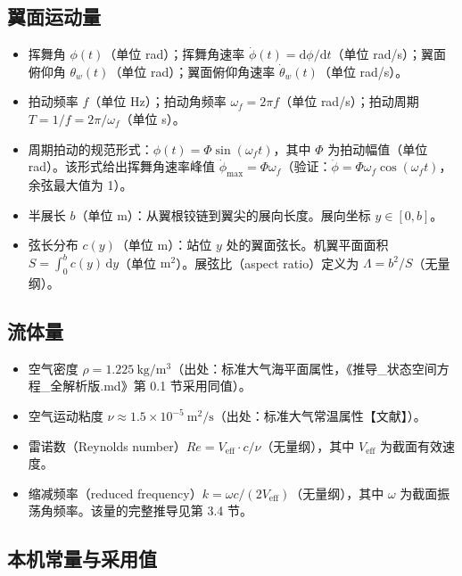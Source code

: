 \documentclass[11pt,a4paper]{ctexart}
\numberwithin{equation}{section}
\begin{document}
\subsection{翼面运动量}

\begin{itemize}
  \item 挥舞角 $\phi(t)$（单位 rad）；挥舞角速率 $\dot{\phi}(t) = \mathrm{d}\phi/\mathrm{d}t$（单位 rad/s）；翼面俯仰角 $\theta_w(t)$（单位 rad）；翼面俯仰角速率 $\dot{\theta}_w(t)$（单位 rad/s）。
  \item 拍动频率 $f$（单位 Hz）；拍动角频率 $\omega_f = 2\pi f$（单位 rad/s）；拍动周期 $T = 1/f = 2\pi/\omega_f$（单位 s）。
  \item 周期拍动的规范形式：$\phi(t) = \Phi\sin(\omega_f t)$，其中 $\Phi$ 为拍动幅值（单位 rad）。该形式给出挥舞角速率峰值 $\dot{\phi}_{\max} = \Phi\omega_f$（验证：$\dot{\phi} = \Phi\omega_f\cos(\omega_f t)$，余弦最大值为 1）。
  \item 半展长 $b$（单位 m）：从翼根铰链到翼尖的展向长度。展向坐标 $y \in [0, b]$。
  \item 弦长分布 $c(y)$（单位 m）：站位 $y$ 处的翼面弦长。机翼平面面积 $S = \int_0^b c(y)\,\mathrm{d}y$（单位 $\mathrm{m^2}$）。展弦比（aspect ratio）定义为 $\Lambda = b^2/S$（无量纲）。
\end{itemize}

\subsection{流体量}

\begin{itemize}
  \item 空气密度 $\rho = 1.225\ \mathrm{kg/m^3}$（出处：标准大气海平面属性，《推导\_状态空间方程\_全解析版.md》第 0.1 节采用同值）。
  \item 空气运动粘度 $\nu \approx 1.5\times10^{-5}\ \mathrm{m^2/s}$（出处：标准大气常温属性【文献】）。
  \item 雷诺数（Reynolds number）$Re = V_{\text{eff}} \cdot c/\nu$（无量纲），其中 $V_{\text{eff}}$ 为截面有效速度。
  \item 缩减频率（reduced frequency）$k = \omega c/(2V_{\text{eff}})$（无量纲），其中 $\omega$ 为截面振荡角频率。该量的完整推导见第 3.4 节。
\end{itemize}

\subsection{本机常量与采用值}
\end{document}
